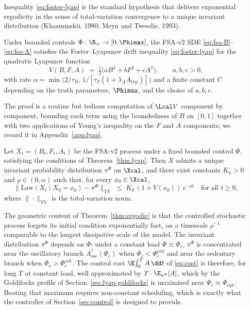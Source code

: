 Inequality \eqref{eq:foster-lyap} is the standard hypothesis that
delivers exponential ergodicity in the sense of total-variation
convergence to a unique invariant distribution
(Khasminskii, 1980; Meyn and Tweedie, 1993).

\begin{theorem}\label{thm:lyap}
Under bounded controls $\Phi:\R_+ \to [0,\Phimax]$, the FSA-v2 SDE
\eqref{eq:fsa-B}--\eqref{eq:fsa-A} satisfies the Foster--Lyapunov
drift inequality \eqref{eq:foster-lyap} for the quadratic Lyapunov
function
\begin{equation}
  V(B,F,A) \;=\; \tfrac{1}{2}\bigl(a B^2 + b F^2 + c A^2\bigr),
  \qquad a,b,c > 0,
  \label{eq:V-quadratic}
\end{equation}
with rate
$\alpha = \min\!\bigl(2/\tau_B,\,1/[\tau_F(1+\lambda_A A_{\mathrm{typ}})]\bigr)$
and a finite constant $C$ depending on the truth parameters,
$\Phimax$, and the choice of $a,b,c$.
\end{theorem}

The proof is a routine but tedious computation of $\Lcal V$
component by component, bounding each term using the boundedness of
$B$ on $[0,1]$ together with two applications of Young's
inequality on the $F$ and $A$ components; we record it in
Appendix~\ref{app:lyap}.

\begin{theorem}\label{thm:ergodic}
Let $X_t = (B_t,F_t,A_t)$ be the FSA-v2 process under a fixed
bounded control $\Phi$, satisfying the conditions of
Theorem~\ref{thm:lyap}. Then $X$ admits a unique invariant
probability distribution $\pi^\Phi$ on $\Xcal$, and there exist
constants $K_0 > 0$ and $\rho \in (0,\alpha)$ such that, for every
$x_0 \in \Xcal$,
\begin{equation}
  \bigl\| \mathrm{Law}(X_t \mid X_0 = x_0) - \pi^\Phi \bigr\|_{\mathrm{TV}}
   \;\le\; K_0\,(1 + V(x_0))\,e^{-\rho t}
  \quad \text{for all } t \ge 0,
  \label{eq:ergodic-bound}
\end{equation}
where $\|\cdot\|_{\mathrm{TV}}$ is the total-variation norm.
\end{theorem}

The geometric content of Theorem~\ref{thm:ergodic} is that the
controlled stochastic process forgets its initial condition
exponentially fast, on a timescale $\rho^{-1}$ comparable to the
longest dissipative scale of the model. The invariant distribution
$\pi^\Phi$ depends on $\Phi$: under a constant load
$\Phi \equiv \Phi_c$, $\pi^\Phi$ is concentrated near the
oscillatory branch $A^*_{\mathrm{osc}}(\Phi_c)$ when $\Phi_c < \Phi_c^{\mathrm{crit}}$
and near the sedentary branch when $\Phi_c > \Phi_c^{\mathrm{crit}}$.
The control cost $\E\!\int_0^T A\,\dd t$ of \eqref{eq:cost} is
therefore, for long $T$ at constant load, well approximated by
$T \cdot \E_{\pi^\Phi}[A]$, which by the Goldilocks profile of
Section~\ref{sec:lyap-goldilocks} is maximised near
$\Phi_c \approx \Phi_{\mathrm{opt}}$. Beating that maximum requires
non-constant scheduling, which is exactly what the controller of
Section~\ref{sec:control} is designed to provide.

